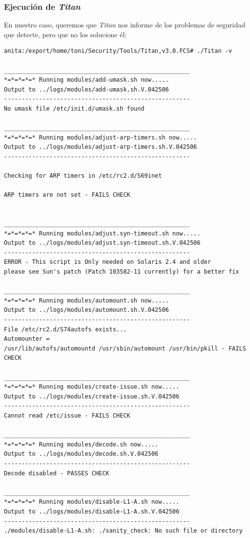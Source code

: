 \subsubsection{Ejecuci\'on de {\it Titan}}
En nuestro caso, queremos que {\it Titan} nos informe de los problemas de
seguridad que detecte, pero que no los solucione \'el:
\begin{verbatim}
anita:/export/home/toni/Security/Tools/Titan,v3.0.FCS# ./Titan -v

_____________________________________________________
*=*=*=*=* Running modules/add-umask.sh now.....
Output to ../logs/modules/add-umask.sh.V.042506
-----------------------------------------------------
No umask file /etc/init.d/umask.sh found

_____________________________________________________
*=*=*=*=* Running modules/adjust-arp-timers.sh now.....
Output to ../logs/modules/adjust-arp-timers.sh.V.042506
-----------------------------------------------------

Checking for ARP timers in /etc/rc2.d/S69inet

ARP timers are not set - FAILS CHECK


_____________________________________________________
*=*=*=*=* Running modules/adjust.syn-timeout.sh now.....
Output to ../logs/modules/adjust.syn-timeout.sh.V.042506
-----------------------------------------------------
ERROR - This script is Only needed on Solaris 2.4 and older
please see Sun's patch (Patch 103582-11 currently) for a better fix

_____________________________________________________
*=*=*=*=* Running modules/automount.sh now.....
Output to ../logs/modules/automount.sh.V.042506
-----------------------------------------------------
File /etc/rc2.d/S74autofs exists...
Automounter =
/usr/lib/autofs/automountd /usr/sbin/automount /usr/bin/pkill - FAILS CHECK

_____________________________________________________
*=*=*=*=* Running modules/create-issue.sh now.....
Output to ../logs/modules/create-issue.sh.V.042506
-----------------------------------------------------
Cannot read /etc/issue - FAILS CHECK

_____________________________________________________
*=*=*=*=* Running modules/decode.sh now.....
Output to ../logs/modules/decode.sh.V.042506
-----------------------------------------------------
Decode disabled - PASSES CHECK

_____________________________________________________
*=*=*=*=* Running modules/disable-L1-A.sh now.....
Output to ../logs/modules/disable-L1-A.sh.V.042506
-----------------------------------------------------
./modules/disable-L1-A.sh: ./sanity_check: No such file or directory


\end{verbatim}
